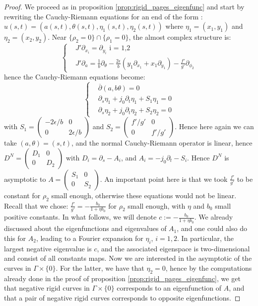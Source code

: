 \documentclass[../main.tex]{subfiles}
\begin{document}
\begin{proof}
We proceed as in proposition \ref{prop:rigid_pages_eigenfunc} and start by rewriting the Cauchy-Riemann equations for an end of the form : $u(s,t) = (a(s,t),\theta(s,t),\eta_1(s,t),\eta_2(s,t))$ where $\eta_1= (x_1,y_1)$ and $\eta_2 = (x_2,y_2)$. Near $\{\rho_2 = 0\}\cap\{\rho_1 = 0\}$, the almost complex structure is:
\begin{equation*}
\left\{
\begin{array}{lll}
    & J'\partial_{x_i} = \partial_{y_i}\mbox{ i = 1,2}\\
    & J'\partial_a = \frac{1}{b}\partial_\theta - \frac{2\epsilon}{b}(y_1\partial_{x_1} + x_1\partial_{y_1}) -\frac{f'}{g'}\partial_{\phi_2}
\end{array}
\right.
\end{equation*}
hence the Cauchy-Riemann equations become: 
\begin{equation*}
\left\{
\begin{array}{lll}
    &\overline{\partial}(a,b\theta) = 0 \\
    & \partial_s\eta_1 + j_0\partial_t\eta_1 + S_1\eta_1 = 0 \\
    &\partial_s\eta_2 + j_0\partial_t\eta_2 + S_2\eta_2 = 0
\end{array}
\right.
\end{equation*}
with $S_1= \begin{pmatrix}-2\epsilon/b&0\\0&2\epsilon/b\end{pmatrix}$ and $S_2 = \begin{pmatrix}
f'/g'&0\\0&f'/g'
\end{pmatrix}$.
Hence here again we can take $(a,\theta ) = (s,t)$, and the normal Cauchy-Riemann operator is linear, hence $D^N = \begin{pmatrix}
    D_1&0\\0&D_2
\end{pmatrix}$
with $D_i = \partial_s - A_i$, and $A_i = -j_0\partial_t - S_i$. Hence $D^N$ is asymptotic to $A = \begin{pmatrix}
    S_1&0\\0&S_2
\end{pmatrix}$. An important point here is that we took $\frac{f'}{g'}$ to be constant for $\rho_2$ small enough, otherwise these equations would not be linear. Recall that we chose: $\frac{f'}{g'} = -\frac{b_0}{1 + \eta b_0}$ for $\rho_2$ small enough, with $\eta$ and $b_0$ small positive constants. In what follows, we will denote $c := -\frac{b_0}{1+\eta b_0}$. We already discussed about the eigenfunctions and eigenvalues of $A_1$, and one could also do this for $A_2$, leading to a Fourier expansion for $\eta_i$, $i = 1,2$. In particular, the largest negative eigenvalue is $c$, and the associated eigenspace is two-dimensional and consist of all constants maps. Now we are interested in the asymptotic of the curves in $\Gamma\times \{0\}$. For the latter, we have that $\eta_2 = 0$, hence by the computations already done in the proof of proposition \ref{prop:rigid_pages_eigenfunc}, we get that negative rigid curves in $\Gamma\times \{0\}$ corresponds to an eigenfunction of $A$, and that a pair of negative rigid curves corresponds to opposite eigenfunctions. 

\end{proof}
\end{document}
